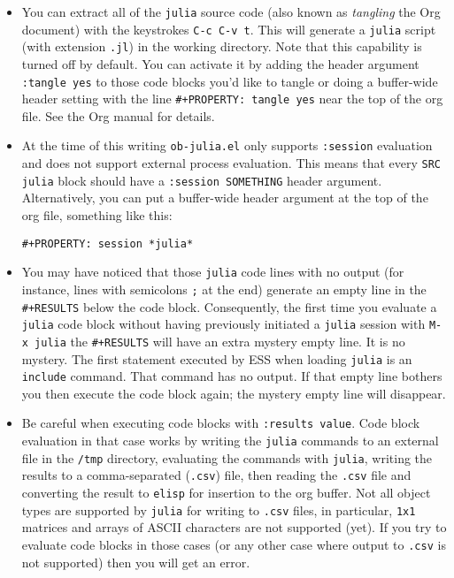 \documentclass[11pt]{article}
\begin{document}
\begin{itemize}
\item You can extract all of the \texttt{julia} source code (also known as
\emph{tangling} the Org document) with the keystrokes \texttt{C-c C-v t}.  This
will generate a \texttt{julia} script (with extension \texttt{.jl}) in the working
directory.  Note that this capability is turned off by default.  You
can activate it by adding the header argument \texttt{:tangle yes} to those
code blocks you'd like to tangle or doing a buffer-wide header
setting with the line \texttt{\#+PROPERTY: tangle yes} near the top of the
org file.  See the Org manual for details.

\item At the time of this writing \texttt{ob-julia.el} only supports \texttt{:session}
evaluation and does not support external process evaluation. This
means that every \texttt{SRC julia} block should have a \texttt{:session
  SOMETHING} header argument.  Alternatively, you can put a
buffer-wide header argument at the top of the org file, something
like this:

\begin{verbatim}
#+PROPERTY: session *julia*
\end{verbatim}

\item You may have noticed that those \texttt{julia} code lines with no output
(for instance, lines with semicolons \texttt{;} at the end) generate an
empty line in the \texttt{\#+RESULTS} below the code block.  Consequently,
the first time you evaluate a \texttt{julia} code block without having
previously initiated a \texttt{julia} session with \texttt{M-x julia} the
\texttt{\#+RESULTS} will have an extra mystery empty line.  It is no
mystery.  The first statement executed by ESS when loading \texttt{julia}
is an \texttt{include} command.  That command has no output.  If that empty
line bothers you then execute the code block again; the mystery
empty line will disappear.

\item Be careful when executing code blocks with \texttt{:results value}.  Code
block evaluation in that case works by writing the \texttt{julia} commands
to an external file in the \texttt{/tmp} directory, evaluating the commands
with \texttt{julia}, writing the results to a comma-separated (\texttt{.csv})
file, then reading the \texttt{.csv} file and converting the result to
\texttt{elisp} for insertion to the org buffer.  Not all object types are
supported by \texttt{julia} for writing to \texttt{.csv} files, in particular,
\texttt{1x1} matrices and arrays of ASCII characters are not supported
(yet).  If you try to evaluate code blocks in those cases (or any
other case where output to \texttt{.csv} is not supported) then you will
get an error.


\end{itemize}
\end{document}
